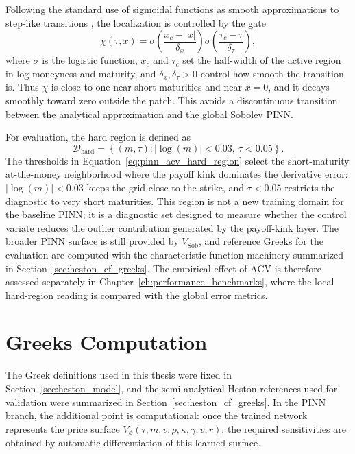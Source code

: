 Following the standard use of sigmoidal functions as smooth approximations to step-like transitions \cite{cybenko1989}, the localization is controlled by the gate
\begin{equation}
\chi(\tau,x)
=
\sigma\!\left(\frac{x_c-|x|}{\delta_x}\right)
\sigma\!\left(\frac{\tau_c-\tau}{\delta_\tau}\right),
\label{eq:pinn_acv_gate}
\end{equation}
where \(\sigma\) is the logistic function, \(x_c\) and \(\tau_c\) set the half-width of the active region in log-moneyness and maturity, and \(\delta_x,\delta_\tau>0\) control how smooth the transition is. Thus \(\chi\) is close to one near short maturities and near \(x=0\), and it decays smoothly toward zero outside the patch. This avoids a discontinuous transition between the analytical approximation and the global Sobolev PINN.

For evaluation, the hard region is defined as
\begin{equation}
\mathcal{D}_{\mathrm{hard}}
=
\left\{(m,\tau):|\log(m)|<0.03,\ \tau<0.05\right\}.
\label{eq:pinn_acv_hard_region}
\end{equation}
The thresholds in Equation~\eqref{eq:pinn_acv_hard_region} select the short-maturity at-the-money neighborhood where the payoff kink dominates the derivative error: \(|\log(m)|<0.03\) keeps the grid close to the strike, and \(\tau<0.05\) restricts the diagnostic to very short maturities. This region is not a new training domain for the baseline PINN; it is a diagnostic set designed to measure whether the control variate reduces the outlier contribution generated by the payoff-kink layer. The broader PINN surface is still provided by \(V_{\mathrm{Sob}}\), and reference Greeks for the evaluation are computed with the characteristic-function machinery summarized in Section~\ref{sec:heston_cf_greeks}. The empirical effect of ACV is therefore assessed separately in Chapter~\ref{ch:performance_benchmarks}, where the local hard-region reading is compared with the global error metrics.

\section{Greeks Computation}

The Greek definitions used in this thesis were fixed in Section~\ref{sec:heston_model}, and the semi-analytical Heston references used for validation were summarized in Section~\ref{sec:heston_cf_greeks}. In the PINN branch, the additional point is computational: once the trained network represents the price surface \(V_\phi(\tau,m,v,\rho,\kappa,\gamma,\bar v,r)\), the required sensitivities are obtained by automatic differentiation of this learned surface.

